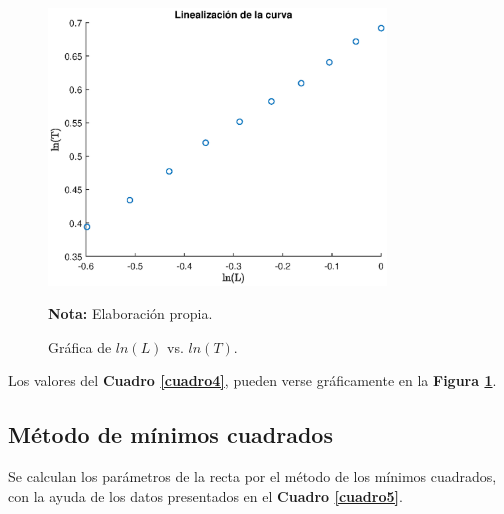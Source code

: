 \documentclass[letter,11pt]{article}
\newcommand{\source}[1]{\vspace{-11pt} \caption*{\small{\textbf{Nota:} {#1}}}}
\begin{document}
\begin{figure}
\centering
\includegraphics[width=0.80\textwidth]{resources/m1.2.eps}
\caption{Gráfica de $ln(L)$ vs. $ln(T)$.}
\label{figura4}
\source{Elaboración propia.}
\end{figure}

Los valores del \textbf{Cuadro \ref{cuadro4}}, pueden verse gráficamente en la
\textbf{Figura \ref{figura4}}.

\subsection{Método de mínimos cuadrados}

Se calculan los parámetros de la recta por el método de los mínimos cuadrados,
con la ayuda de los datos presentados en el \textbf{Cuadro \ref{cuadro5}}.
\end{document}
